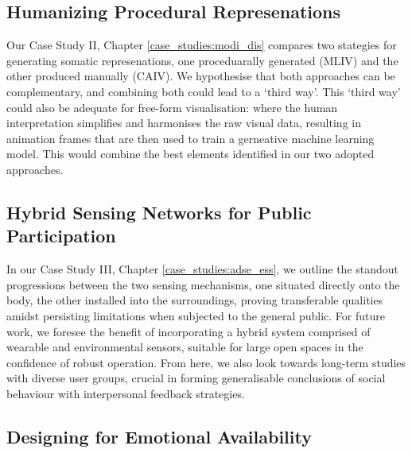 \subsection{Humanizing Procedural Represenations}

Our Case Study II, Chapter \ref{case_studies:modi_dis} compares two stategies for generating somatic represenations, one proceduarally generated (MLIV) and the other produced manually (CAIV). We hypothesise that both approaches can be complementary, and combining both could lead to a ‘third way’. This ‘third way’ could also be adequate for free-form visualisation: where the human interpretation simplifies and harmonises the raw visual data, resulting in animation frames that are then used to train a gerneative machine learning model. This would combine the best elements identified in our two adopted approaches.

\subsection{Hybrid Sensing Networks for Public Participation}

In our Case Study III, Chapter \ref{case_studies:adse_ess}, we outline the standout progressions between the two sensing mechanisms, one situated directly onto the body, the other installed into the surroundings, proving transferable qualities amidst persisting limitations when subjected to the general public. For future work, we foresee the benefit of incorporating a hybrid system comprised of wearable and environmental sensors, suitable for large open spaces in the confidence of robust operation. From here, we also look towards long-term studies with diverse user groups, crucial in forming generalisable conclusions of social behaviour with interpersonal feedback strategies.

\subsection{Designing for Emotional Availability}

